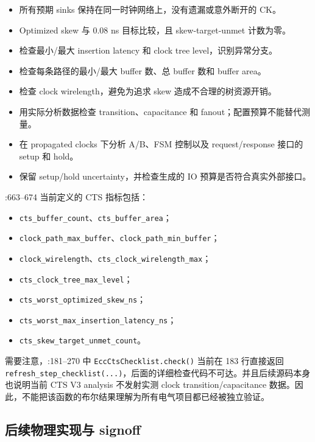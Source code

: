 \documentclass[UTF8,a4paper,11pt,fontset=fandol]{ctexart}
\newcommand{\code}[1]{\nolinkurl{#1}}
\begin{document}
\begin{itemize}[leftmargin=2em]
  \item[$\square$] 所有预期 sinks 保持在同一时钟网络上，没有遗漏或意外断开的 CK。
  \item[$\square$] Optimized skew 与 0.08 ns 目标比较，且 skew-target-unmet 计数为零。
  \item[$\square$] 检查最小/最大 insertion latency 和 clock tree level，识别异常分支。
  \item[$\square$] 检查每条路径的最小/最大 buffer 数、总 buffer 数和 buffer area。
  \item[$\square$] 检查 clock wirelength，避免为追求 skew 造成不合理的树资源开销。
  \item[$\square$] 用实际分析数据检查 transition、capacitance 和 fanout；配置预算不能替代测量。
  \item[$\square$] 在 propagated clocks 下分析 A/B、FSM 控制以及 request/response 接口的 setup 和 hold。
  \item[$\square$] 保留 setup/hold uncertainty，并检查生成的 IO 预算是否符合真实外部接口。
\end{itemize}

:663--674 当前定义的 CTS 指标包括：
\begin{itemize}
  \item \code{cts_buffer_count}、\code{cts_buffer_area}；
  \item \code{clock_path_max_buffer}、\code{clock_path_min_buffer}；
  \item \code{clock_wirelength}、\code{cts_clock_wirelength_max}；
  \item \code{cts_clock_tree_max_level}；
  \item \code{cts_worst_optimized_skew_ns}；
  \item \code{cts_worst_max_insertion_latency_ns}；
  \item \code{cts_skew_target_unmet_count}。
\end{itemize}

需要注意，:181--270 中 \code{EccCtsChecklist.check()} 当前在 183 行直接返回 \code{refresh_step_checklist(...)}，后面的详细检查代码不可达。并且后续源码本身也说明当前 CTS V3 analysis 不发射实测 clock transition/capacitance 数据。因此，不能把该函数的布尔结果理解为所有电气项目都已经被独立验证。

\subsection{后续物理实现与 signoff}
\end{document}
